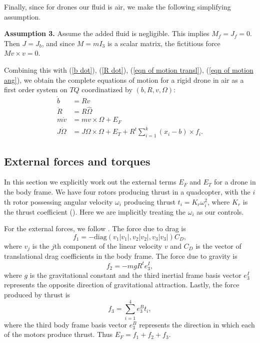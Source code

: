 \documentclass{aims}
\theoremstyle{definition}
\begin{document}
Finally, since for drones our fluid is air, we make the following simplifying assumption.

\textbf{Assumption 3.}  Assume the added fluid is negligible.  This implies $M_f=J_f=0$. Then $J=J_b$, and since $M=mI_3$ is a scalar matrix, the fictitious force $Mv \times v=0$.

Combining this with (\ref{b dot}), (\ref{R dot}), (\ref{eqn of motion transl}), (\ref{eqn of motion ang}), we obtain the complete equations of motion for a rigid drone in air as a first order system on $TQ$ coordinatized by $(b, R, v, \Omega)$:
\begin{align}
\dot{b} &= Rv \\
\dot{R} &= R\hat{\Omega} \\
m\dot{v} &= mv \times \Omega + E_F  \\
J\dot{\Omega} &= J\Omega \times \Omega + %
E_T + R^t\sum_{i=1}^k(x_i-b) \times f_i. \label{Omega dot}
\end{align}


\subsection{External forces and torques}\label{subsec: extrenal}
In this section we explicitly work out the external terms $E_F$ and $E_T$ for a drone in the body frame.  We have four rotors producing thrust in a quadcopter, with the $i$th rotor possessing  angular velocity  $\omega_i$ producing thrust $t_i=K_r\omega_i^2$, where $K_r$ is the thrust coefficient (\cite{Mueller}).  Here we are implicitly treating the $\omega_i$ as our controls.

For the external forces, we follow \cite{Stepanyan}.  
The force due to drag is 
$$f_1=-\text{diag}(v_1|v_1|,v_2|v_2|,v_3|v_3|)C_D,$$ 
where $v_j$ is the $j$th component of the linear velocity $v$ and $C_D$ is the vector of translational drag coefficients in the body frame.
The force due to gravity is 
$$f_2=-mgR^te_3^I,$$
where $g$ is the gravitational constant and  the third inertial frame basis vector $e_3^I$ represents the opposite direction of gravitational attraction.
Lastly, the force produced by thrust is $$f_3=\sum_{i=1}^4e_3^Bt_i,$$
where the third body frame basis vector $e_3^B$ represents the direction in which each of the motors produce thrust.
Thus $E_F=f_1+f_2+f_3$.  
\end{document}
